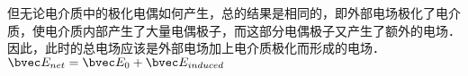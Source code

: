 

但无论电介质中的极化电偶如何产生，总的结果是相同的，即外部电场极化了电介质，使电介质内部产生了大量电偶极子，而这部分电偶极子又产生了额外的电场．因此，此时的总电场应该是外部电场加上电介质极化而形成的电场．
$\bvec E_{net}=\bvec E_{0}+\bvec E_{induced}$

